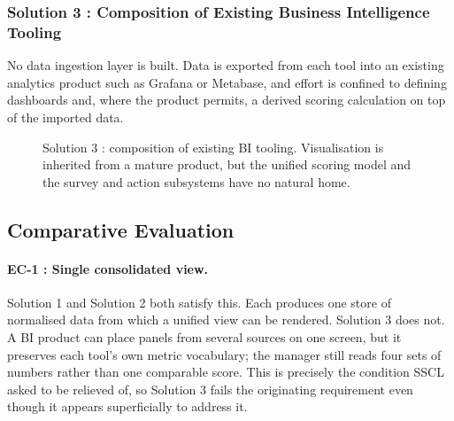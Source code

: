 \subsubsection{Solution 3 : Composition of Existing Business Intelligence Tooling}
No data ingestion layer is built. Data is exported from each tool into an
existing analytics product such as Grafana or Metabase, and effort is confined to defining dashboards and, where the product permits, a derived scoring
calculation on top of the imported data.
\begin{figure}[htbp]\centering
{}
\caption{Solution 3 : composition of existing BI tooling. Visualisation is inherited
from a mature product, but the unified scoring model and the survey and action
subsystems have no natural home.}
\label{fig:s3-bi}
\end{figure}

\subsection{Comparative Evaluation}
\label{subsec:primary-evaluation}

\paragraph{EC-1 : Single consolidated view.} 
Solution 1 and Solution 2 both satisfy this. Each produces one store of normalised data from
which a unified view can be rendered. Solution 3 does not. A BI product can place panels
from several sources on one screen, but it preserves each tool's own metric
vocabulary; the manager still reads four sets of numbers rather than one
comparable score. This is precisely the condition SSCL asked to be relieved
of, so Solution 3 fails the originating requirement even though it appears superficially
to address it.

